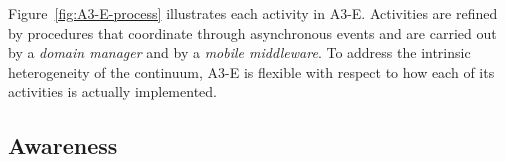 Figure~\ref{fig:A3-E-process} illustrates each activity in A3-E. 
Activities are refined by procedures that coordinate through asynchronous events and are carried out by a \textit{domain manager} and by a \textit{mobile middleware}. 
To address the intrinsic heterogeneity of the continuum, A3-E is flexible with respect to how each of its activities is actually implemented. 






\subsection{Awareness}\label{sec:A3-E-awareness}




